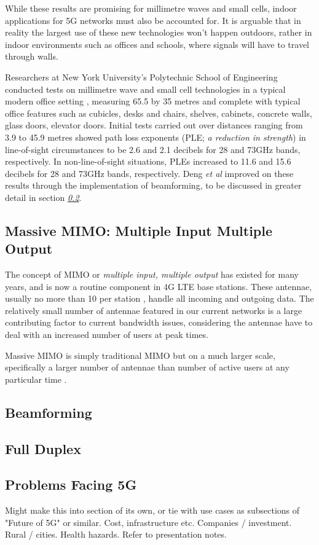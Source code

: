 \documentclass[journal]{IEEEtran}
\begin{document}
While these results are promising for millimetre waves and small cells, indoor applications for 5G networks must also be accounted for. It is arguable that in reality the largest use of these new technologies won't happen outdoors, rather in indoor environments such as offices and schools, where signals will have to travel through walls. 

Researchers at New York University's Polytechnic School of Engineering conducted tests on millimetre wave and small cell technologies in a typical modern office setting \cite{28_73ghz}, measuring 65.5 by 35 metres and complete with typical office features such as cubicles, desks and chairs, shelves, cabinets, concrete walls, glass doors, elevator doors. Initial tests carried out over distances ranging from 3.9 to 45.9 metres showed path loss exponents (PLE; \textit{a reduction in strength}) in line-of-sight circumstances to be 2.6 and 2.1 decibels for 28 and 73GHz bands, respectively. In non-line-of-sight situations, PLEs increased to 11.6 and 15.6 decibels for 28 and 73GHz bands, respectively. Deng \textit{et al} improved on these results through the implementation of beamforming, to be discussed in greater detail in section \textit{\ref{subsec:beamf}}.

\subsection{Massive MIMO: Multiple Input Multiple Output}
The concept of MIMO or \textit{multiple input, multiple output} has existed for many years, and is now a routine component in 4G LTE base stations. These antennae, usually no more than 10 per station \cite{mimo}, handle all incoming and outgoing data. The relatively small number of antennae featured in our current networks is a large contributing factor to current bandwidth issues, considering the antennae have to deal with an increased number of users at peak times.

Massive MIMO is simply traditional MIMO but on a much larger scale, specifically a larger number of antennae than number of active users at any particular time \cite{whatwill5gbe}. 
\subsection{Beamforming}\label{subsec:beamf}
\subsection{Full Duplex}
\subsection{Problems Facing 5G}
Might make this into section of its own, or tie with use cases as subsections of "Future of 5G" or similar.
Cost, infrastructure etc. Companies / investment. Rural / cities. Health hazards. Refer to presentation notes.
\end{document}

